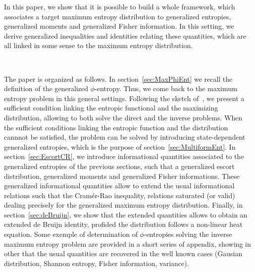 \documentclass[english,sort&compress]{elsarticle}
\theoremstyle{definition}
\theoremstyle{plain}
\theoremstyle{plain}
\begin{document}
In this  paper, we show that  it is possible  to build a whole  framework, which
associates  a  target maximum  entropy  distribution  to generalized  entropies,
generalized moments  and generalized  Fisher information.   In this  setting, we
derive generalized inequalities and  identities relating these quantities, which
are all linked in some sense to the maximum entropy distribution.


\

The paper is organized as  follows. In section~\ref{sec:MaxPhiEnt} we recall the
definition of the generalized $\phi$-entropy.  Thus, we come back to the maximum
entropy   problem   in   this    general   settings.    Following   the   sketch
of~\cite{KesKap89},  we  present a  sufficient  condition  linking the  entropic
functional and  the maximizing distribution,  allowing to both solve  the direct
and the inverse  problems.  When the sufficient conditions  linking the entropic
function and the distribution cannnot be satisfied, the problem can be solved by
introducing  state-dependent  generalized entropies,  which  is  the purpose  of
section~\ref{sec:MultiformEnt}.   In  section~\ref{sec:EscortCR},  we  introduce
informational quantities associated to the generalized entropies of the previous
sections, such that  a generalized escort distribution,  generalized moments and
generalized  Fisher informations.   These  generalized informational  quantities
allow to  extend the  usual informational relations  such that  the Cram\'er-Rao
inequality, relations saturated (or valid) dealing precisely for the generalized
maximum entropy  distribution.  Finally, in section~\ref{sec:deBruijn},  we show
that the  extended quantities allows to  obtain an extended de  Bruijn identity,
profided the distribution  follows a non-linear heat equation.   Some exemple of
determination of  $\phi$-entropies solving  the inverse maximum  entropy problem
are provided  in a  short series of  appendix, showing in  other that  the usual
quantities are recovered in the  well known cases (Gausian distribution, Shannon
entropy, Fisher information, variance).


\end{document}
